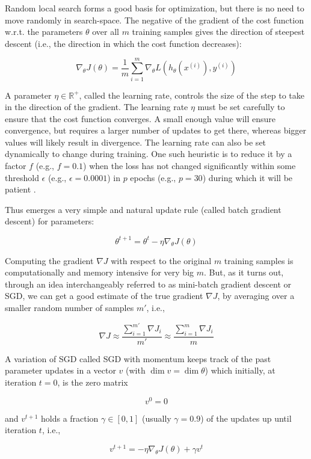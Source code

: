 Random local search forms a good basis for optimization, but there is no need to move randomly in search-space. The negative of the gradient of the cost function w.r.t. the parameters $\theta$ over all $m$ training samples gives the direction of steepest descent (i.e., the direction in which the cost function decreases):

$$
\nabla_{\theta} J(\theta) = \frac{1}{m} \sum_{i=1}^{m} \nabla_{\theta} L(h_{\theta}(x^{(i)}), y^{(i)})
$$

A parameter $\eta \in \mathbb{{R}^{+}}$, called the learning rate, controls the size of the step to take in the direction of the gradient. The learning rate $\eta$ must be set carefully to ensure that the cost function converges. A small enough value will ensure convergence, but requires a larger number of updates to get there, whereas bigger values will likely result in divergence. The learning rate can also be set dynamically to change during training. One such heuristic is to reduce it by a factor $f$ (e.g., $f=0.1$) when the loss has not changed significantly within some threshold $\epsilon$ (e.g., $\epsilon=0.0001$) in $p$ epochs (e.g., $p=30$) during which it will be patient \cite{learningrateschedules}.

Thus emerges a very simple and natural update rule (called batch gradient descent) for parameters:

$$
\theta^{t+1} = \theta^t - \eta \nabla_{\theta} J(\theta)
$$

Computing the gradient $\nabla J$ with respect to the original $m$ training samples is computationally and memory intensive for very big $m$. But, as it turns out, through an idea interchangeably referred to as mini-batch gradient descent or \ac{SGD}, we can get a good estimate of the true gradient $\nabla J$, by averaging over a smaller random number of samples $m'$, i.e.,

$$
\nabla J \approx \frac{\sum_{i=1}^{m'} \nabla J_i}{m'} \approx \frac{\sum_{i=1}^m \nabla J_{i}}{m}
$$

A variation of \ac{SGD} called \ac{SGD} with momentum \cite{ruder2016} keeps track of the past parameter updates in a vector $v$ (with $\dim v = \dim \theta$) which initially, at iteration $t = 0$, is the zero matrix

$$
v^0 = 0
$$

and $v^{t+1}$ holds a fraction $\gamma \in [0,1]$ (usually $\gamma = 0.9$) of the updates up until iteration $t$, i.e.,

$$
v^{t+1} = -\eta \nabla_{\theta} J(\theta) + \gamma v^{t}
$$

